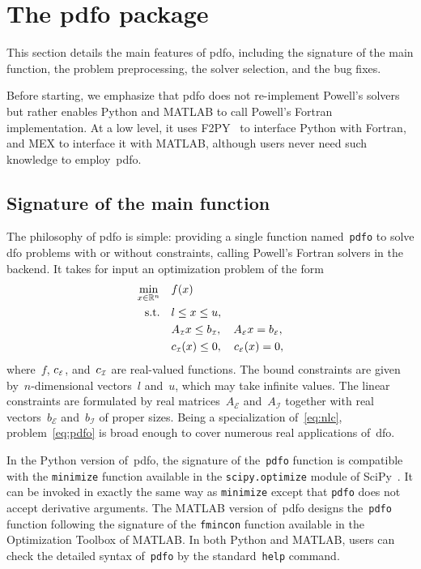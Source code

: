 \documentclass[
    smallextended,  %
    final,        %
]{svjour3}
\newcommand{\R}{\mathbb{R}}
\newcommand{\aeq}{A_{\scriptscriptstyle\mathcal{E}}}
\newcommand{\aub}{A_{\scriptscriptstyle\mathcal{I}}}
\newcommand{\beq}{b_{\scriptscriptstyle\mathcal{E}}}
\newcommand{\bub}{b_{\scriptscriptstyle\mathcal{I}}}
\newcommand{\ceq}{\con[\scriptscriptstyle\mathcal{E}]}
\newcommand{\con}[1][i]{c\ifthenelse{\equal{#1}{}}{}{_{#1}}}
\newcommand{\cub}{\con[\scriptscriptstyle\mathcal{I}]}
\newcommand{\obj}{f}
\newcommand{\st}{\text{s.t.}}
\newcommand{\xl}{l}
\newcommand{\xu}{u}
\newcommand{\pdfofun}{\texttt{pdfo}\xspace}
\begin{document}
\section{The \gls{pdfo} package}
\label{sec:pdfo}

This section details the main features of \gls{pdfo}, including the signature of the main
function, the problem preprocessing, the solver selection, and the bug fixes.

Before starting, we
emphasize that \gls{pdfo} does not re-implement Powell’s solvers but rather enables Python and MATLAB
to call Powell's Fortran implementation.
At a low level, it uses F2PY~\cite{Peterson_2009} to interface Python with Fortran, and MEX to
interface it with MATLAB, although users never need such knowledge to employ~\gls{pdfo}.

\subsection{Signature of the main function}

The philosophy of \gls{pdfo} is simple: providing a single function named~\pdfofun to solve
\gls{dfo} problems with or without constraints, calling Powell's Fortran solvers in the backend.
It takes for input an optimization problem of the form
\begin{subequations}
    \label{eq:pdfo}
    \begin{align}
        \min_{x \in \R^n}   & \quad \obj(x)\\
        \st                 & \quad \xl \le x \le \xu, \label{eq:pdfo-b}\\
                            & \quad \aub x \le \bub, \quad \aeq x = \beq, \label{eq:pdfo-l}\\
                            & \quad \cub(x) \le 0, \quad \ceq(x) = 0, \label{eq:pdfo-nl}
    \end{align}
\end{subequations}
where~$\obj$, $\ceq$, and~$\cub$ are real-valued functions. The bound constraints are given
by~$n$-dimensional vectors~$\xl$ and~$\xu$, which may take infinite values. The linear constraints
are formulated by real matrices~$\aeq$ and~$\aub$ together with real vectors~$\beq$ and~$\bub$ of
proper sizes. Being a specialization of~\eqref{eq:nlc}, problem~\eqref{eq:pdfo} is broad enough to
cover numerous real applications of~\gls{dfo}.

In the Python version of~\gls{pdfo}, the signature of the~\pdfofun function is compatible with
the \texttt{minimize} function available in the \texttt{scipy.optimize} module of
SciPy~\cite{Virtanen_Etal_2020}. It can be invoked in exactly
the same way as \texttt{minimize} except that \pdfofun does not accept derivative arguments.
The MATLAB version of~\gls{pdfo} designs the~\pdfofun function following the signature of
the \texttt{fmincon} function available in the Optimization Toolbox of MATLAB.
In both Python and MATLAB, users can check the detailed syntax of~\pdfofun by the
standard~\texttt{help} command.
\end{document}

